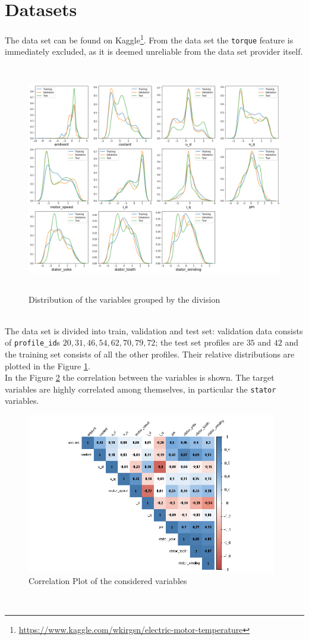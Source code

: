 \section{Datasets}
The data set can be found on Kaggle\footnote{\href{https://www.kaggle.com/wkirgsn/electric-motor-temperature}{https://www.kaggle.com/wkirgsn/electric-motor-temperature}}.
From the data set the \verb|torque| feature is immediately excluded, as it is deemed unreliable from the data set provider itself.
\begin{figure}[!h]
    \centering
    \includegraphics[width=\linewidth, height=10cm]{imgs/dist_plot.png}
    \caption{Distribution of the variables grouped by the division}
    \label{fig:dist_plot}
\end{figure}\\
The data set is divided into train, validation and test set: validation data consists of \verb|profile_id|s $20, 31, 46, 54, 62, 70, 79, 72$; the test set profiles are $35$ and $42$ and the training set consists of all the other profiles.
Their relative distributions are plotted in the Figure \ref{fig:dist_plot}.\\
In the Figure \ref{fig:corrplot} the correlation between the variables is shown.
The target variables are highly correlated among themselves, in particular the \verb|stator| variables.
\begin{figure}[!h]
    \centering
    \includegraphics[width=\linewidth, height=7cm]{imgs/corrplot.png}
    \caption{Correlation Plot of the considered variables}
    \label{fig:corrplot}
\end{figure}\\
